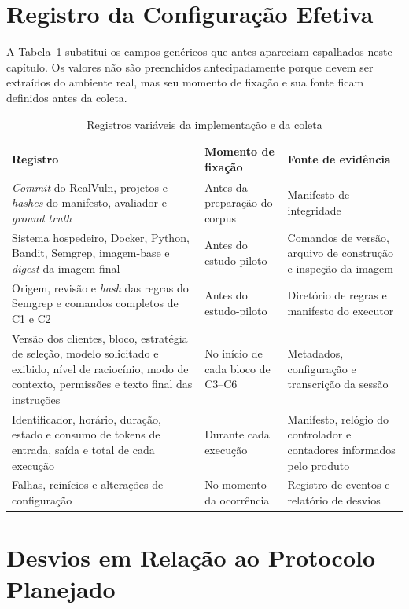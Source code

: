 \section{Registro da Configuração Efetiva}\label{sec:registro-configuracao-desenvolvimento}

A Tabela~\ref{tab:registro-configuracao-efetiva} substitui os campos genéricos que antes apareciam espalhados neste capítulo. Os valores não são preenchidos antecipadamente porque devem ser extraídos do ambiente real, mas seu momento de fixação e sua fonte ficam definidos antes da coleta.

\begin{table}[htb]
\ABNTEXfontereduzida
\caption{\label{tab:registro-configuracao-efetiva}Registros variáveis da implementação e da coleta}
\centering
\begin{tabularx}{\textwidth}{|X|X|X|}
\hline
\textbf{Registro} & \textbf{Momento de fixação} & \textbf{Fonte de evidência} \\
\hline
\textit{Commit} do RealVuln, projetos e \textit{hashes} do manifesto, avaliador e \textit{ground truth} & Antes da preparação do corpus & Manifesto de integridade \\
\hline
Sistema hospedeiro, Docker, Python, Bandit, Semgrep, imagem-base e \textit{digest} da imagem final & Antes do estudo-piloto & Comandos de versão, arquivo de construção e inspeção da imagem \\
\hline
Origem, revisão e \textit{hash} das regras do Semgrep e comandos completos de C1 e C2 & Antes do estudo-piloto & Diretório de regras e manifesto do executor \\
\hline
Versão dos clientes, bloco, estratégia de seleção, modelo solicitado e exibido, nível de raciocínio, modo de contexto, permissões e texto final das instruções & No início de cada bloco de C3--C6 & Metadados, configuração e transcrição da sessão \\
\hline
Identificador, horário, duração, estado e consumo de tokens de entrada, saída e total de cada execução & Durante cada execução & Manifesto, relógio do controlador e contadores informados pelo produto \\
\hline
Falhas, reinícios e alterações de configuração & No momento da ocorrência & Registro de eventos e relatório de desvios \\
\hline
\end{tabularx}
\end{table}

\section{Desvios em Relação ao Protocolo Planejado}\label{sec:desvios-protocolo}

